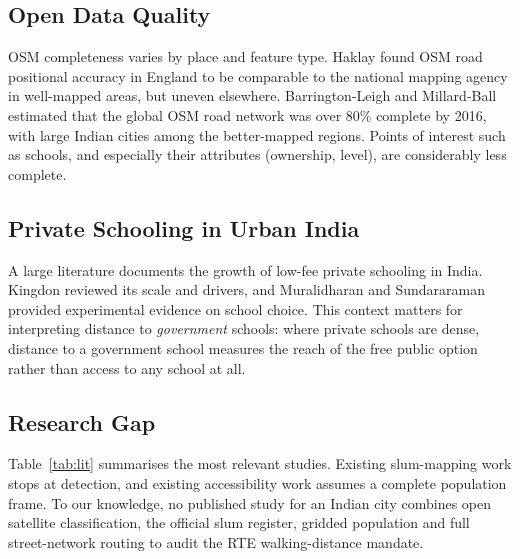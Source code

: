 \documentclass[conference]{IEEEtran}
\begin{document}
\subsection{Open Data Quality}
OSM completeness varies by place and feature type. Haklay \cite{haklay2010} found OSM road positional accuracy in England to be comparable to the national mapping agency in well-mapped areas, but uneven elsewhere. Barrington-Leigh and Millard-Ball \cite{barrington2017} estimated that the global OSM road network was over 80\% complete by 2016, with large Indian cities among the better-mapped regions. Points of interest such as schools, and especially their attributes (ownership, level), are considerably less complete.

\subsection{Private Schooling in Urban India}
A large literature documents the growth of low-fee private schooling in India. Kingdon \cite{kingdon2020} reviewed its scale and drivers, and Muralidharan and Sundararaman \cite{muralidharan2015} provided experimental evidence on school choice. This context matters for interpreting distance to \emph{government} schools: where private schools are dense, distance to a government school measures the reach of the free public option rather than access to any school at all.

\subsection{Research Gap}
Table~\ref{tab:lit} summarises the most relevant studies. Existing slum-mapping work stops at detection, and existing accessibility work assumes a complete population frame. To our knowledge, no published study for an Indian city combines open satellite classification, the official slum register, gridded population and full street-network routing to audit the RTE walking-distance mandate.
\end{document}
